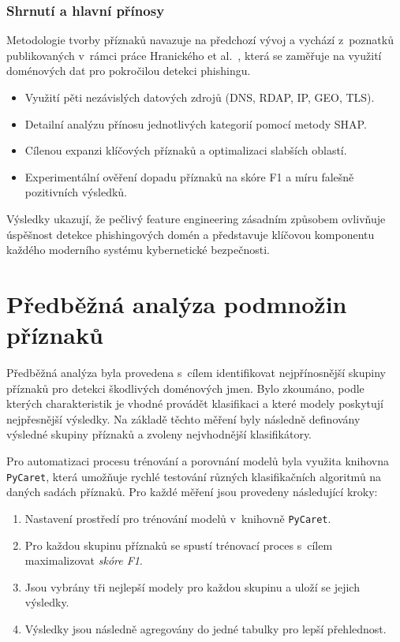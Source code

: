 \subsection{Shrnutí a hlavní přínosy}

Metodologie tvorby příznaků navazuje na předchozí vývoj a vychází z~poznatků publikovaných v~rámci práce Hranického et al. \cite{CNSM}, která se zaměřuje na využití doménových dat pro pokročilou detekci phishingu.

\begin{itemize} \item Využití pěti nezávislých datových zdrojů (DNS, RDAP, IP, GEO, TLS). \item Detailní analýzu přínosu jednotlivých kategorií pomocí metody SHAP. \item Cílenou expanzi klíčových příznaků a optimalizaci slabších oblastí. \item Experimentální ověření dopadu příznaků na skóre F1 a míru falešně pozitivních výsledků. \end{itemize}

\noindent Výsledky ukazují, že pečlivý feature engineering zásadním způsobem ovlivňuje úspěšnost detekce phishingových domén a představuje klíčovou komponentu každého moderního systému kybernetické bezpečnosti.



\chapter{Předběžná analýza podmnožin příznaků}
\label{chapter:7}

Předběžná analýza byla provedena s~cílem identifikovat nejpřínosnější skupiny příznaků pro detekci škodlivých doménových jmen. Bylo zkoumáno, podle kterých charakteristik je vhodné provádět klasifikaci a které modely poskytují nejpřesnější výsledky. Na základě těchto měření byly následně definovány výsledné skupiny příznaků a zvoleny nejvhodnější klasifikátory.


Pro automatizaci procesu trénování a porovnání modelů byla využita knihovna \texttt{PyCaret}, která umožňuje rychlé testování různých klasifikačních algoritmů na daných sadách příznaků. Pro každé měření jsou provedeny následující kroky:

\begin{enumerate}
    \item Nastavení prostředí pro trénování modelů v~knihovně \texttt{PyCaret}.
    \item Pro každou skupinu příznaků se spustí trénovací proces s~cílem maximalizovat \textit{skóre F1}.
    \item Jsou vybrány tři nejlepší modely pro každou skupinu a uloží se jejich výsledky.
    \item Výsledky jsou následně agregovány do jedné tabulky pro lepší přehlednost.
\end{enumerate}

